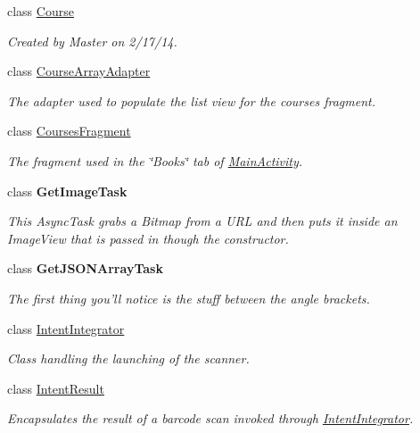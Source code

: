 \begin{DoxyCompactItemize}
class \hyperlink{classcom_1_1lakehead_1_1textbookmarket_1_1_course}{Course}
\begin{DoxyCompactList}\small\item\em Created by Master on 2/17/14. \end{DoxyCompactList}\item 
class \hyperlink{classcom_1_1lakehead_1_1textbookmarket_1_1_course_array_adapter}{Course\-Array\-Adapter}
\begin{DoxyCompactList}\small\item\em The adapter used to populate the list view for the courses fragment. \end{DoxyCompactList}\item 
class \hyperlink{classcom_1_1lakehead_1_1textbookmarket_1_1_courses_fragment}{Courses\-Fragment}
\begin{DoxyCompactList}\small\item\em The fragment used in the \char`\"{}\-Books\char`\"{} tab of \hyperlink{classcom_1_1lakehead_1_1textbookmarket_1_1_main_activity}{Main\-Activity}. \end{DoxyCompactList}\item 
class {\bfseries Get\-Image\-Task}
\begin{DoxyCompactList}\small\item\em This Async\-Task grabs a Bitmap from a U\-R\-L and then puts it inside an Image\-View that is passed in though the constructor. \end{DoxyCompactList}\item 
class {\bfseries Get\-J\-S\-O\-N\-Array\-Task}
\begin{DoxyCompactList}\small\item\em The first thing you'll notice is the stuff between the angle brackets. \end{DoxyCompactList}\item 
class \hyperlink{classcom_1_1lakehead_1_1textbookmarket_1_1_intent_integrator}{Intent\-Integrator}
\begin{DoxyCompactList}\small\item\em Class handling the launching of the scanner. \end{DoxyCompactList}\item 
class \hyperlink{classcom_1_1lakehead_1_1textbookmarket_1_1_intent_result}{Intent\-Result}
\begin{DoxyCompactList}\small\item\em Encapsulates the result of a barcode scan invoked through \hyperlink{classcom_1_1lakehead_1_1textbookmarket_1_1_intent_integrator}{Intent\-Integrator}. \end{DoxyCompactList}\item 

\end{DoxyCompactItemize}
